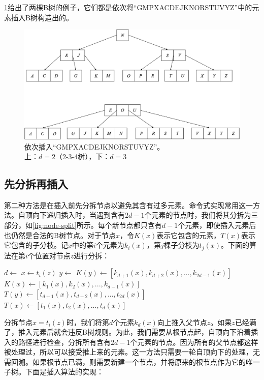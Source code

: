 \documentclass[b5paper]{ctexart}
\begin{document}
\cref{fig:btree-insert-fp}给出了两棵B树的例子，它们都是依次将``GMPXACDEJKNORSTUVYZ''中的元素插入B树构造出的。

\begin{figure}[htbp]
  \centering
  \includegraphics[scale=0.4]{img/btree-insert-fp}
  \captionsetup{justification=centering}
  \caption{依次插入``GMPXACDEJKNORSTUVYZ''。\\
上：$d = 2$（2-3-4树），下：$d = 3$}
  \label{fig:btree-insert-fp}
\end{figure}

\subsection{先分拆再插入}

第二种方法是在插入前先分拆节点以避免其含有过多元素。命令式实现常用这一方法。自顶向下递归插入时，当遇到含有$2d - 1$个元素的节点时，我们将其分拆为三部分，如\cref{fig:node-split}所示。每个新节点都只含有$d - 1$个元素，即使插入元素后也仍然是合法的B树节点。对于节点$x$，令$K(x)$表示它包含的元素，$T(x)$表示它包含的子分枝。记$x$中的第$i$个元素为$k_i(x)$，第$j$棵子分枝为$t_j(x)$。下面的算法在第$i$个位置对节点$z$进行分拆：

\begin{algorithmic}[1]
  \State $d \gets$ 
  \State $x \gets t_i(z)$
  \State $y \gets$ 
  \State $K(y) \gets [k_{d + 1}(x), k_{d + 2}(x), ..., k_{2d - 1}(x)]$
  \State $K(x) \gets [k_1(x), k_2(x), ..., k_{d-1}(x)]$
    \State $T(y) \gets [t_{d + 1}(x), t_{d + 2}(x), ..., t_{2d}(x)]$
    \State $T(x) \gets [t_1(x), t_2(x), ..., t_d(x)]$
  \EndIf
  \State {}
  \State {}
\EndProcedure
\end{algorithmic}

分拆节点$x = t_i(z)$时，我们将第$d$个元素$k_d(x)$向上推入父节点$z$。如果$z$已经满了，推入元素后就会违反B树规则。为此，我们需要从根节点起，自顶向下沿着插入的路径进行检查，分拆所有含有$2d - 1$个元素的节点。因为所有的父节点都这样被处理过，所以可以接受推上来的元素。这一方法只需要一轮自顶向下的处理，无需回溯。如果根节点已满，则需要新建一个节点，并将原来的根节点作为它的唯一子树。下面是插入算法的实现：
\end{document}
